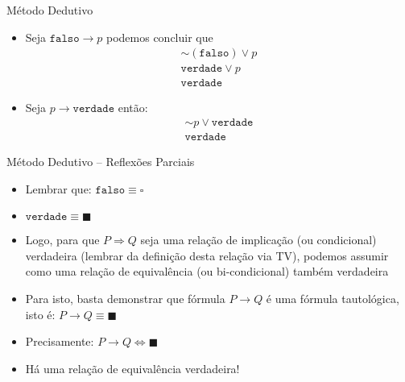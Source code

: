 \begin{frame}[t]{Método Dedutivo}
	\begin{itemize}
	\item Seja $\mathtt{falso} \rightarrow p$ podemos concluir que $$\begin{array}{c}\sim(\mathtt{falso}) \vee p \\ \mathtt{verdade} \vee p \\ \mathtt{verdade}\end{array}$$

	\item Seja $p \rightarrow \mathtt{verdade}$ então: $$\begin{array}{c} \sim p \vee \mathtt{verdade} \\ \mathtt{verdade}\end{array}$$
	\end{itemize}
\end{frame}


\begin{frame}[t]{Método Dedutivo -- Reflexões Parciais}

	\begin{itemize}
	\item Lembrar que: $\mathtt{falso} \equiv  \square$ 
    \item $\mathtt{verdade} \equiv \blacksquare  $

	\item Logo, para que  $P \Rightarrow Q $ seja uma relação
de implicação (ou condicional)
 verdadeira (lembrar da definição desta relação via TV), podemos
assumir como uma relação de equivalência (ou bi-condicional)
também verdadeira

   \item Para isto, basta demonstrar que fórmula $P \rightarrow Q $ é uma fórmula
tautológica, isto é: $P \rightarrow Q \equiv \blacksquare  $

 \item Precisamente: $P \rightarrow Q \Leftrightarrow \blacksquare  $

\item Há uma relação  de equivalência verdadeira!

	\end{itemize}

\end{frame}








